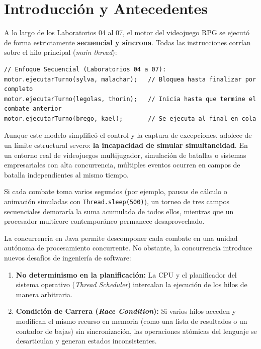 \documentclass[11pt,letterpaper]{article}
\begin{document}
\section{Introducción y Antecedentes}

A lo largo de los Laboratorios 04 al 07, el motor del videojuego RPG se ejecutó de forma estrictamente \textbf{secuencial y síncrona}. Todas las instrucciones corrían sobre el hilo principal (\textit{main thread}):

\begin{lstlisting}[style=JavaStyle,numbers=none]
// Enfoque Secuencial (Laboratorios 04 a 07):
motor.ejecutarTurno(sylva, malachar);   // Bloquea hasta finalizar por completo
motor.ejecutarTurno(legolas, thorin);   // Inicia hasta que termine el combate anterior
motor.ejecutarTurno(brego, kael);       // Se ejecuta al final en cola
\end{lstlisting}

Aunque este modelo simplificó el control y la captura de excepciones, adolece de un límite estructural severo: \textbf{la incapacidad de simular simultaneidad}. En un entorno real de videojuegos multijugador, simulación de batallas o sistemas empresariales con alta concurrencia, múltiples eventos ocurren en campos de batalla independientes al mismo tiempo.

Si cada combate toma varios segundos (por ejemplo, pausas de cálculo o animación simuladas con \texttt{Thread.sleep(500)}), un torneo de tres campos secuenciales demoraría la suma acumulada de todos ellos, mientras que un procesador multicore contemporáneo permanece desaprovechado.

La concurrencia en Java permite descomponer cada combate en una unidad autónoma de procesamiento concurrente. No obstante, la concurrencia introduce nuevos desafíos de ingeniería de software:
\begin{enumerate}
    \item \textbf{No determinismo en la planificación:} La CPU y el planificador del sistema operativo (\textit{Thread Scheduler}) intercalan la ejecución de los hilos de manera arbitraria.
    \item \textbf{Condición de Carrera (\textit{Race Condition}):} Si varios hilos acceden y modifican el mismo recurso en memoria (como una lista de resultados o un contador de bajas) sin sincronización, las operaciones atómicas del lenguaje se desarticulan y generan estados inconsistentes.
\end{enumerate}
\end{document}
